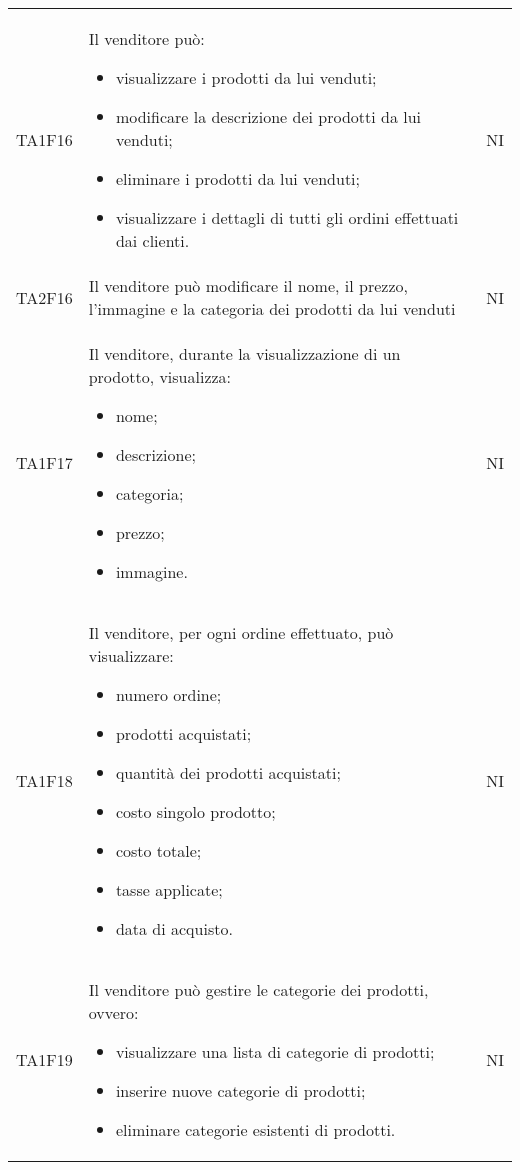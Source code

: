 {\begin{longtable}{C{3cm} C{10.2cm} C{1.5cm}}
TA1F16 & Il venditore può:
\begin{itemize}
	\item visualizzare i prodotti da lui venduti;
	\item modificare la descrizione dei prodotti da lui venduti;
	\item eliminare i prodotti da lui venduti;
	\item visualizzare i dettagli di tutti gli ordini effettuati dai clienti.
\end{itemize} & NI\\

TA2F16 & Il venditore può modificare il nome, il prezzo, l'immagine e la categoria dei prodotti da lui venduti & NI\\

TA1F17 & Il venditore, durante la visualizzazione di un prodotto, visualizza:
\begin{itemize}
	\item nome;
	\item descrizione;
	\item categoria;
	\item prezzo;
	\item immagine.
\end{itemize} & NI\\

TA1F18 & Il venditore, per ogni ordine effettuato, può visualizzare:
\begin{itemize}
	\item numero ordine;
	\item prodotti acquistati;
	\item quantità dei prodotti acquistati;
	\item costo singolo prodotto;
	\item costo totale;
	\item tasse applicate;
	\item data di acquisto.
\end{itemize}
& NI\\

TA1F19 & Il venditore può gestire le categorie dei prodotti, ovvero:
\begin{itemize}
	\item visualizzare una lista di categorie di prodotti;
	\item inserire nuove categorie di prodotti;
	\item eliminare categorie esistenti di prodotti.
\end{itemize}
& NI\\






\end{longtable}}
